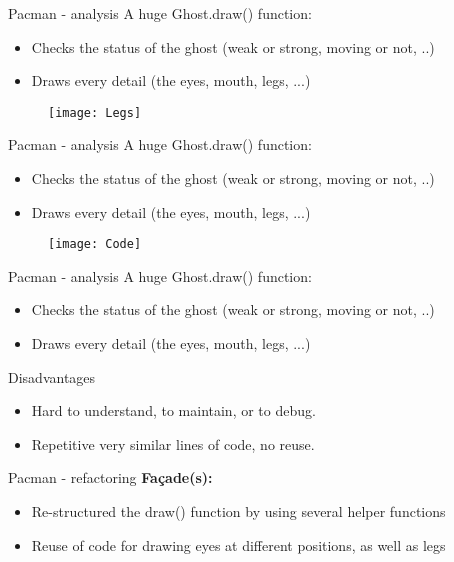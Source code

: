 \documentclass{beamer}
\begin{document}
\begin{frame}{Pacman - analysis}
A huge Ghost.draw() function:
 \begin{itemize}
      \item Checks the status of the ghost (weak or strong, moving or not, ..)
      \item Draws every detail (the eyes, mouth, legs, ...)
    \end{itemize}
   \begin{figure}[htp]
    \centering
    \texttt{[image: Legs]}
    \label{fig:legs}
    \end{figure}
\end{frame}

\begin{frame}{Pacman - analysis}
A huge Ghost.draw() function:
 \begin{itemize}
      \item Checks the status of the ghost (weak or strong, moving or not, ..)
      \item Draws every detail (the eyes, mouth, legs, ...)
    \end{itemize}
   \begin{figure}[htp]
    \centering
    \texttt{[image: Code]}
    \label{fig:legs}
    \end{figure}
\end{frame}

\begin{frame}{Pacman - analysis}
A huge Ghost.draw() function:
 \begin{itemize}
      \item Checks the status of the ghost (weak or strong, moving or not, ..)
      \item Draws every detail (the eyes, mouth, legs, ...)
    \end{itemize}
 \begin{block}{Disadvantages}
      \begin{itemize} 
    \item Hard to understand, to maintain, or to debug.
    \item Repetitive very similar lines of code, no reuse.
    \end{itemize}
    \end{block}
\end{frame}

\begin{frame}{Pacman - refactoring}
\textbf{Fa\c{c}ade(s):}
   \begin{itemize}
    \item Re-structured the draw() function by using several helper functions
    \item Reuse of code for drawing eyes at different positions, as well as legs
    \end{itemize}
\end{frame}
\end{document}
